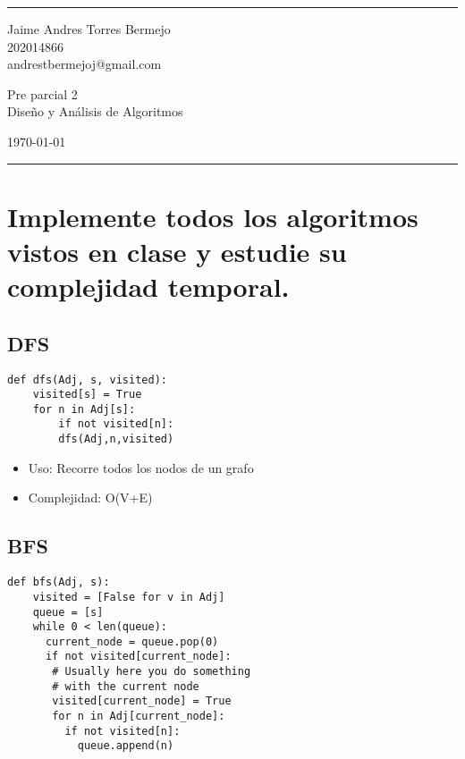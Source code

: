 \documentclass[a4paper]{article}
\begin{document}

\fancyhead[C]{}
\hrule \medskip %
\begin{minipage}{0.295\textwidth} 
\raggedright
\footnotesize
Jaime Andres Torres Bermejo \hfill\\   
202014866\hfill\\
andrestbermejoj@gmail.com
\end{minipage}
\begin{minipage}{0.4\textwidth} 
\centering 
\large 
Pre parcial 2\\ 
\normalsize 
Diseño y Análisis de Algoritmos\\ 
\end{minipage}
\begin{minipage}{0.295\textwidth} 
\raggedleft
\today\hfill\\
\end{minipage}
\medskip\hrule 
\bigskip

\section{Implemente todos los algoritmos vistos en clase y estudie su complejidad temporal.}
\subsection{DFS}
\begin{verbatim}
def dfs(Adj, s, visited): 
    visited[s] = True
    for n in Adj[s]:
        if not visited[n]:
        dfs(Adj,n,visited)
\end{verbatim}

\begin{itemize}
    \item Uso: Recorre todos los nodos de un grafo
    \item Complejidad: O(V+E)
    
\end{itemize}

\subsection{BFS}
\begin{verbatim}
def bfs(Adj, s): 
    visited = [False for v in Adj] 
    queue = [s]
    while 0 < len(queue): 
      current_node = queue.pop(0)
      if not visited[current_node]:
       # Usually here you do something 
       # with the current node
       visited[current_node] = True
       for n in Adj[current_node]:
         if not visited[n]:
           queue.append(n)
\end{verbatim}
\end{document}
